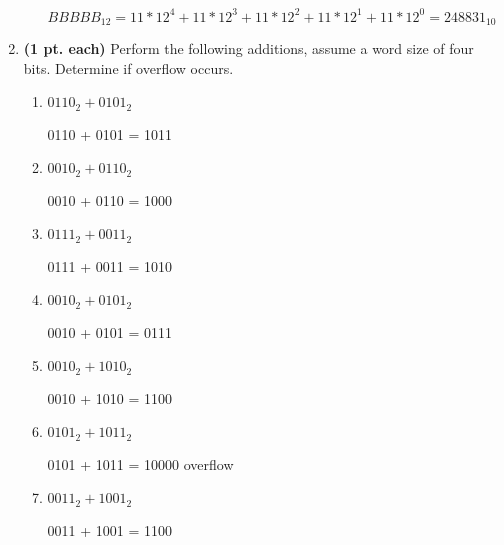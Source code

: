 \begin{enumerate}
\begin{enumerate}
	\begin{solution}{ $BBBBB_{12} = 11*12^4+11*12^3+11*12^2+11*12^1+11*12^0=248831_{10}$ }\end{solution}
	\end{enumerate}


\item {\bf (1 pt. each)} Perform the following additions, assume a word 
size of four bits. Determine if overflow occurs.
	\begin{enumerate}
	\item $0110_2 + 0101_2$

	\begin{solution}{0110 + 0101 = 1011}\end{solution}
	\item $0010_2 + 0110_2$

	\begin{solution}{0010 + 0110 = 1000}\end{solution}
	\item $0111_2 + 0011_2$

	\begin{solution}{0111 + 0011 = 1010}\end{solution}
	\item $0010_2 + 0101_2$

	\begin{solution}{0010 + 0101 = 0111}\end{solution}
	\item $0010_2 + 1010_2$

	\begin{solution}{0010 + 1010 = 1100}\end{solution}
	\item $0101_2 + 1011_2$

	\begin{solution}{0101 + 1011 = 10000 overflow}\end{solution}
	\item $0011_2 + 1001_2$

	\begin{solution}{0011 + 1001 = 1100}\end{solution}
	\end{enumerate}
\end{enumerate}
